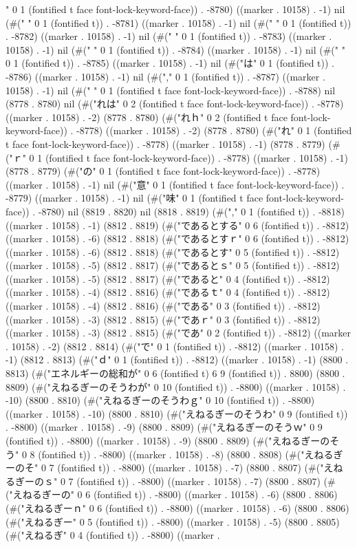 {" 0 1 (fontified t face font-lock-keyword-face)) . -8780) ((marker . 10158) . -1) nil (#("	" 0 1 (fontified t)) . -8781) ((marker . 10158) . -1) nil (#(" " 0 1 (fontified t)) . -8782) ((marker . 10158) . -1) nil (#(" " 0 1 (fontified t)) . -8783) ((marker . 10158) . -1) nil (#(" " 0 1 (fontified t)) . -8784) ((marker . 10158) . -1) nil (#(" " 0 1 (fontified t)) . -8785) ((marker . 10158) . -1) nil (#("は" 0 1 (fontified t)) . -8786) ((marker . 10158) . -1) nil (#("," 0 1 (fontified t)) . -8787) ((marker . 10158) . -1) nil (#(" " 0 1 (fontified t face font-lock-keyword-face)) . -8788) nil (8778 . 8780) nil (#("れは" 0 2 (fontified t face font-lock-keyword-face)) . -8778) ((marker . 10158) . -2) (8778 . 8780) (#("れｈ" 0 2 (fontified t face font-lock-keyword-face)) . -8778) ((marker . 10158) . -2) (8778 . 8780) (#("れ" 0 1 (fontified t face font-lock-keyword-face)) . -8778) ((marker . 10158) . -1) (8778 . 8779) (#("ｒ" 0 1 (fontified t face font-lock-keyword-face)) . -8778) ((marker . 10158) . -1) (8778 . 8779) (#("の" 0 1 (fontified t face font-lock-keyword-face)) . -8778) ((marker . 10158) . -1) nil (#("意" 0 1 (fontified t face font-lock-keyword-face)) . -8779) ((marker . 10158) . -1) nil (#("味" 0 1 (fontified t face font-lock-keyword-face)) . -8780) nil (8819 . 8820) nil (8818 . 8819) (#("," 0 1 (fontified t)) . -8818) ((marker . 10158) . -1) (8812 . 8819) (#("であるとする" 0 6 (fontified t)) . -8812) ((marker . 10158) . -6) (8812 . 8818) (#("であるとすｒ" 0 6 (fontified t)) . -8812) ((marker . 10158) . -6) (8812 . 8818) (#("であるとす" 0 5 (fontified t)) . -8812) ((marker . 10158) . -5) (8812 . 8817) (#("であるとｓ" 0 5 (fontified t)) . -8812) ((marker . 10158) . -5) (8812 . 8817) (#("であると" 0 4 (fontified t)) . -8812) ((marker . 10158) . -4) (8812 . 8816) (#("であるｔ" 0 4 (fontified t)) . -8812) ((marker . 10158) . -4) (8812 . 8816) (#("である" 0 3 (fontified t)) . -8812) ((marker . 10158) . -3) (8812 . 8815) (#("であｒ" 0 3 (fontified t)) . -8812) ((marker . 10158) . -3) (8812 . 8815) (#("であ" 0 2 (fontified t)) . -8812) ((marker . 10158) . -2) (8812 . 8814) (#("で" 0 1 (fontified t)) . -8812) ((marker . 10158) . -1) (8812 . 8813) (#("ｄ" 0 1 (fontified t)) . -8812) ((marker . 10158) . -1) (8800 . 8813) (#("エネルギーの総和が" 0 6 (fontified t) 6 9 (fontified t)) . 8800) (8800 . 8809) (#("えねるぎーのそうわが" 0 10 (fontified t)) . -8800) ((marker . 10158) . -10) (8800 . 8810) (#("えねるぎーのそうわｇ" 0 10 (fontified t)) . -8800) ((marker . 10158) . -10) (8800 . 8810) (#("えねるぎーのそうわ" 0 9 (fontified t)) . -8800) ((marker . 10158) . -9) (8800 . 8809) (#("えねるぎーのそうｗ" 0 9 (fontified t)) . -8800) ((marker . 10158) . -9) (8800 . 8809) (#("えねるぎーのそう" 0 8 (fontified t)) . -8800) ((marker . 10158) . -8) (8800 . 8808) (#("えねるぎーのそ" 0 7 (fontified t)) . -8800) ((marker . 10158) . -7) (8800 . 8807) (#("えねるぎーのｓ" 0 7 (fontified t)) . -8800) ((marker . 10158) . -7) (8800 . 8807) (#("えねるぎーの" 0 6 (fontified t)) . -8800) ((marker . 10158) . -6) (8800 . 8806) (#("えねるぎーｎ" 0 6 (fontified t)) . -8800) ((marker . 10158) . -6) (8800 . 8806) (#("えねるぎー" 0 5 (fontified t)) . -8800) ((marker . 10158) . -5) (8800 . 8805) (#("えねるぎ" 0 4 (fontified t)) . -8800) ((marker . }
